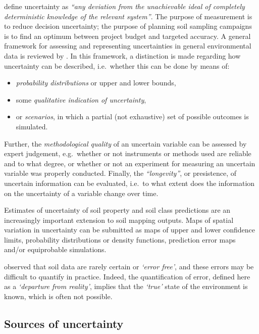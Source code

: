 \documentclass[11pt]{krantz}
\makeatletter
\newenvironment{kframe}{%
\medskip{}
\setlength{\fboxsep}{.8em}
 \def\at@end@of@kframe{}%
 \ifinner\ifhmode%
  \def\at@end@of@kframe{\end{minipage}}%
  \begin{minipage}{\columnwidth}%
 \fi\fi%
 \def\FrameCommand##1{\hskip\@totalleftmargin \hskip-\fboxsep
 \colorbox{shadecolor}{##1}\hskip-\fboxsep
     \hskip-\linewidth \hskip-\@totalleftmargin \hskip\columnwidth}%
 \MakeFramed {\advance\hsize-\width
   \@totalleftmargin\z@ \linewidth\hsize
   \@setminipage}}%
 {\par\unskip\endMakeFramed%
 \at@end@of@kframe}
\newenvironment{rmdblock}[1]
  {
  \begin{itemize}
  \renewcommand{\labelitemi}{
    \raisebox{-.7\height}[0pt][0pt]{
      {\setkeys{Gin}{width=3em,keepaspectratio}\texttt{[image: images/\#1]}}
    }
  }
  \setlength{\fboxsep}{1em}
  \begin{kframe}
  \item
  }
  {
  \end{kframe}
  \end{itemize}
  }
\newenvironment{rmdnote}
  {\begin{rmdblock}{note}}
  {\end{rmdblock}}
\theoremstyle{definition}
\theoremstyle{definition}
\theoremstyle{definition}
\theoremstyle{remark}
\makeatother
\begin{document}
\citet{Walker2003IA} define uncertainty as \emph{``any deviation from
the unachievable ideal of completely deterministic knowledge of the
relevant system''}. The purpose of measurement is to reduce decision
uncertainty; the purpose of planning soil sampling campaigns is to find
an optimum between project budget and targeted accuracy. A general
framework for assessing and representing uncertainties in general
environmental data is reviewed by \citet{Refsgaard2007UEM}. In this
framework, a distinction is made regarding how uncertainty can be
described, i.e.~whether this can be done by means of:

\begin{itemize}
\item
  \emph{probability distributions} or upper and lower bounds,
\item
  some \emph{qualitative indication of uncertainty},
\item
  or \emph{scenarios}, in which a partial (not exhaustive) set of
  possible outcomes is simulated.
\end{itemize}

Further, the \emph{methodological quality} of an uncertain variable can
be assessed by expert judgement, e.g.~whether or not instruments or
methods used are reliable and to what degree, or whether or not an
experiment for measuring an uncertain variable was properly conducted.
Finally, the \emph{``longevity''}, or presistence, of uncertain
information can be evaluated, i.e.~to what extent does the information
on the uncertainty of a variable change over time.

\begin{rmdnote}
Estimates of uncertainty of soil property and soil class predictions are
an increasingly important extension to soil mapping outputs. Maps of
spatial variation in uncertainty can be submitted as maps of upper and
lower confidence limits, probability distributions or density functions,
prediction error maps and/or equiprobable simulations.
\end{rmdnote}

\citet{Heuvelink2006Elsevier} observed that soil data are rarely certain
or \emph{`error free'}, and these errors may be difficult to quantify in
practice. Indeed, the quantification of error, defined here as a
\emph{`departure from reality'}, implies that the \emph{`true'} state of
the environment is known, which is often not possible.

\hypertarget{sources-uncertainty}{%
\subsection{Sources of uncertainty}\label{sources-uncertainty}}
\end{document}
